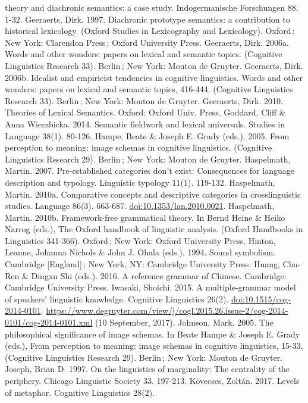 \documentclass[12pt,article,oneside]{memoir}
\theoremstyle{definition}
\theoremstyle{definition}
\theoremstyle{definition}
\theoremstyle{remark}
\begin{document}
theory and diachronic semantics: a case study. Indogermanische
Forschungen 88. 1-32. Geeraerts, Dirk. 1997. Diachronic prototype
semantics: a contribution to historical lexicology. (Oxford Studies in
Lexicography and Lexicology). Oxford\,: New York: Clarendon Press\,;
Oxford University Press. Geeraerts, Dirk. 2006a. Words and other
wonders: papers on lexical and semantic topics. (Cognitive Linguistics
Research 33). Berlin\,; New York: Mouton de Gruyter. Geeraerts, Dirk.
2006b. Idealist and empiricist tendencies in cognitive linguistics.
Words and other wonders: papers on lexical and semantic topics, 416-444.
(Cognitive Linguistics Research 33). Berlin\,; New York: Mouton de
Gruyter. Geeraerts, Dirk. 2010. Theories of Lexical Semantics. Oxford:
Oxford Univ. Press. Goddard, Cliff \& Anna Wierzbicka. 2014. Semantic
fieldwork and lexical universals. Studies in Language 38(1). 80-126.
Hampe, Beate \& Joseph E. Grady (eds.). 2005. From perception to
meaning: image schemas in cognitive linguistics. (Cognitive Linguistics
Research 29). Berlin\,; New York: Mouton de Gruyter. Haspelmath, Martin.
2007. Pre-established categories don't exist: Consequences for language
description and typology. Linguistic typology 11(1). 119-132.
Haspelmath, Martin. 2010a. Comparative concepts and descriptive
categories in crosslinguistic studies. Language 86(3). 663-687.
\url{doi:10.1353/lan.2010.0021}. Haspelmath, Martin. 2010b.
Framework-free grammatical theory. In Bernd Heine \& Heiko Narrog
(eds.), The Oxford handbook of linguistic analysis. (Oxford Handbooks in
Linguistics 341-366). Oxford\,; New York: Oxford University Press.
Hinton, Leanne, Johanna Nichols \& John J. Ohala (eds.). 1994. Sound
symbolism. Cambridge {[}England{]}\,; New York, NY: Cambridge University
Press. Huang, Chu-Ren \& Dingxu Shi (eds.). 2016. A reference grammar of
Chinese. Cambridge: Cambridge University Press. Iwasaki, Shoichi. 2015.
A multiple-grammar model of speakers' linguistic knowledge. Cognitive
Linguistics 26(2). \url{doi:10.1515/cog-2014-0101}.
\url{https://www.degruyter.com/view/j/cogl.2015.26.issue-2/cog-2014-0101/cog-2014-0101.xml}
(10 September, 2017). Johnson, Mark. 2005. The philosophical
significance of image schemas. In Beate Hampe \& Joseph E. Grady (eds.),
From perception to meaning: image schemas in cognitive linguistics,
15-33. (Cognitive Linguistics Research 29). Berlin\,; New York: Mouton
de Gruyter. Joseph, Brian D. 1997. On the linguistics of marginality:
The centrality of the periphery. Chicago Linguistic Society 33. 197-213.
Kövecses, Zoltán. 2017. Levels of metaphor. Cognitive Linguistics 28(2).
\end{document}

